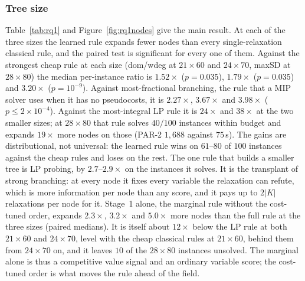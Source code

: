 \documentclass[final,5p,times,twocolumn,authoryear]{elsarticle}
\begin{document}
\subsubsection{Tree size}
Table~\ref{tab:rq1} and Figure~\ref{fig:rq1nodes} give the main result. At each of the three sizes the learned rule expands fewer nodes than every single-relaxation classical rule, and the paired test is significant for every one of them. Against the strongest cheap rule at each size (dom/wdeg at $21\times60$ and $24\times70$, maxSD at $28\times80$) the median per-instance ratio is $1.52\times$ ($p=0.035$), $1.79\times$ ($p=0.035$) and $3.20\times$ ($p=10^{-9}$). Against most-fractional branching, the rule that a MIP solver uses when it has no pseudocosts, it is $2.27\times$, $3.67\times$ and $3.98\times$ ($p\le2\times10^{-4}$). Against the most-integral LP rule it is $24\times$ and $38\times$ at the two smaller sizes; at $28\times80$ that rule solves $40/100$ instances within budget and expands $19\times$ more nodes on those (PAR-2 $1{,}688$ against $75$\,s).
The gains are distributional, not universal: the learned rule wins on $61$--$80$ of $100$ instances against the cheap rules and loses on the rest. The one rule that builds a smaller tree is LP probing, by $2.7$--$2.9\times$ on the instances it solves. It is the transplant of strong branching: at every node it fixes every variable the relaxation can refute, which is more information per node than any score, and it pays up to $2|K|$ relaxations per node for it. Stage~1 alone, the marginal rule without the cost-tuned order, expands $2.3\times$, $3.2\times$ and $5.0\times$ more nodes than the full rule at the three sizes (paired medians). It is itself about $12\times$ below the LP rule at both $21\times60$ and $24\times70$, level with the cheap classical rules at $21\times60$, behind them from $24\times70$ on, and it leaves $10$ of the $28\times80$ instances unsolved. The marginal alone is thus a competitive value signal and an ordinary variable score; the cost-tuned order is what moves the rule ahead of the field.
\end{document}
